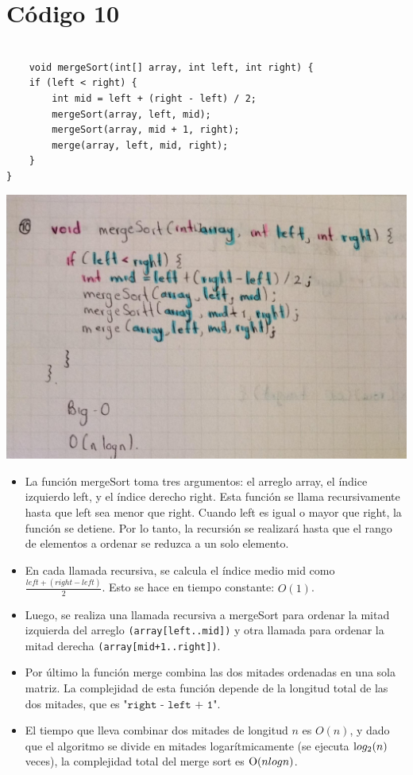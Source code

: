 \documentclass[a4paper,onecolumn,10pt]{article}
\begin{document}
\section{Código 10}

\begin{verbatim}

    void mergeSort(int[] array, int left, int right) {
    if (left < right) {
        int mid = left + (right - left) / 2;
        mergeSort(array, left, mid);
        mergeSort(array, mid + 1, right);
        merge(array, left, mid, right);
    }
}

\end{verbatim}

\includegraphics[width=1\linewidth]{imagenes/punto 10.jpeg}

\begin{itemize}
    \item La función mergeSort toma tres argumentos: el arreglo array, el índice izquierdo left, y el índice derecho right. Esta función se llama recursivamente hasta que left sea menor que right. Cuando left es igual o mayor que right, la función se detiene. Por lo tanto, la recursión se realizará hasta que el rango de elementos a ordenar se reduzca a un solo elemento.

    \item En cada llamada recursiva, se calcula el índice medio mid como $\frac{left+(right-left)}{2}$. Esto se hace en tiempo constante: $O(1)$.

    \item Luego, se realiza una llamada recursiva a mergeSort para ordenar la mitad izquierda del arreglo \texttt{(array[left..mid])} y otra llamada para ordenar la mitad derecha \texttt{(array[mid+1..right])}.

    \item Por último la función merge combina las dos mitades ordenadas en una sola matriz. La complejidad de esta función depende de la longitud total de las dos mitades, que es "$\texttt{right - left + 1}$".

    \item El tiempo que lleva combinar dos mitades de longitud $n$ es $O(n)$, y dado que el algoritmo se divide en mitades logarítmicamente (se ejecuta $\text log_2(n)$ veces), la complejidad total del merge sort es $\text O(n log n)$.

\end{itemize}
\end{document}
